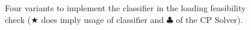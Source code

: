 \begin{figure}[ht]
    \vspace{1em}

    \caption[Four variants to implement the classifier in the loading feasibility check.]{Four variants to implement the classifier in the loading feasibility check ($\bigstar$
        does imply usage of classifier and $\clubsuit$ of the CP Solver).}
    \label{fig:four_variants}
\end{figure}
